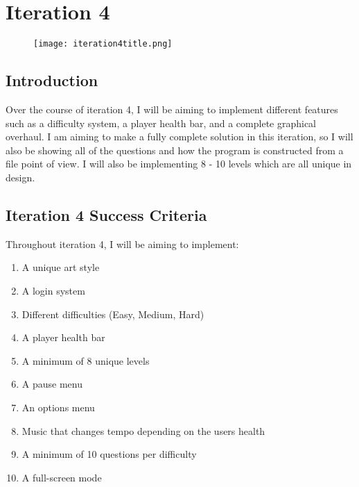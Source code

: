 \documentclass[12pt]{report}
\begin{document}
\pagebreak

\chapter{Iteration 4}

\begin{figure}[H]
    \centering
    \texttt{[image: iteration4title.png]}
    \label{iteration2title}
\end{figure}

\pagebreak

\section{Introduction}
Over the course of iteration 4, I will be aiming to implement different features such as a difficulty system, a player health bar, and a complete graphical overhaul. I am aiming to make a fully complete solution in this iteration, so I will also be showing all of the questions and how the program is constructed from a file point of view. I will also be implementing 8 - 10 levels which are all unique in design.


\section{Iteration 4 Success Criteria}
Throughout iteration 4, I will be aiming to implement:

\begin{enumerate}
    \item A unique art style
    \item A login system
    \item Different difficulties (Easy, Medium, Hard)
    \item A player health bar
    \item A minimum of 8 unique levels
    \item A pause menu 
    \item An options menu
    \item Music that changes tempo depending on the users health
    \item A minimum of 10 questions per difficulty
    \item A full-screen mode
\end{enumerate}
\end{document}

